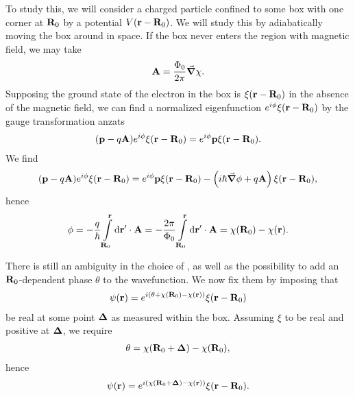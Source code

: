 To study this, we will consider a charged particle confined to some box with one corner at $\vb{R}_{0}$ by a potential $V(\vb{r} - \vb{R}_{0})$. We will study this by adiabatically moving the box around in space. If the box never enters the region with magnetic field, we may take
\begin{align*}
\vb{A} = \frac{\Phi_{0}}{2\pi}\grad{\chi}.
\end{align*}
Supposing the ground state of the electron in the box is $\xi(\vb{r} - \vb{R}_{0})$ in the absence of the magnetic field, we can find a normalized eigenfunction $e^{i\phi}\xi(\vb{r} - \vb{R}_{0})$ by the gauge transformation anzats
\begin{align*}
(\vb{p} - q\vb{A})e^{i\phi}\xi(\vb{r} - \vb{R}_{0}) = e^{i\phi}\vb{p}\xi(\vb{r} - \vb{R}_{0}).
\end{align*}
We find
\begin{align*}
(\vb{p} - q\vb{A})e^{i\phi}\xi(\vb{r} - \vb{R}_{0}) = e^{i\phi}\vb{p}\xi(\vb{r} - \vb{R}_{0}) - \left(i\hbar\grad{\phi} + q\vb{A}\right)\xi(\vb{r} - \vb{R}_{0}),
\end{align*}
hence
\begin{align*}
\phi = -\frac{q}{\hbar}\int\limits_{\vb{R}_{0}}^{\vb{r}}\dd{\vb{r}\ensuremath{^{\prime}}}\cdot\vb{A} = -\frac{2\pi}{\Phi_{0}}\int\limits_{\vb{R}_{0}}^{\vb{r}}\dd{\vb{r}\ensuremath{^{\prime}}}\cdot\vb{A} = \chi(\vb{R}_{0}) - \chi(\vb{r}).
\end{align*}

There is still an ambiguity in the choice of \chi, as well as the possibility to add an $\vb{R}_{0}$-dependent phase $\theta$ to the wavefunction. We now fix them by imposing that
\begin{align*}
\psi(\vb{r}) = e^{i(\theta + \chi(\vb{R}_{0}) - \chi(\vb{r}))}\xi(\vb{r} - \vb{R}_{0})
\end{align*}
be real at some point $\vb*{\Delta}$ as measured within the box. Assuming $\xi$ to be real and positive at $\vb*{\Delta}$, we require
\begin{align*}
\theta = \chi(\vb{R}_{0} + \vb*{\Delta}) - \chi(\vb{R}_{0}),
\end{align*}
hence
\begin{align*}
\psi(\vb{r}) = e^{i(\chi(\vb{R}_{0} + \vb*{\Delta}) - \chi(\vb{r}))}\xi(\vb{r} - \vb{R}_{0}).
\end{align*}

